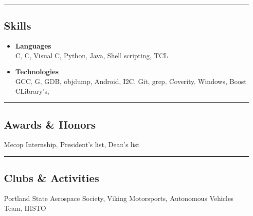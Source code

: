 \documentclass[10pt,letterpaper]{article}
\newcommand{\CPP}
{C\nolinebreak[4]\hspace{-.05em}\raisebox{.22ex}{\footnotesize\bf ++}}
\newcommand{\GPP}
{G\nolinebreak[4]\hspace{-.05em}\raisebox{.22ex}{\footnotesize\bf ++}}
\begin{document}
\hrule

\subsection*{Skills}
	\begin{itemize}
		\item 
		\textbf{Languages}\\
		 C, \CPP, Visual \CPP,  Python, Java, Shell scripting, TCL
		\item
		\textbf{Technologies}\\
		GCC, \GPP{}, GDB, objdump, Android, I2C, Git, grep, Coverity, Windows, Boost \CPP Library's, 
	\end{itemize}

\hrule

\subsection*{Awards \& Honors}
			Mecop Internship, President's list, Dean's list\\

\hrule

\subsection*{Clubs \& Activities}
			Portland State Aerospace Society, Viking Motorsports, Autonomous Vehicles Team, IHSTO\\
\end{document}
